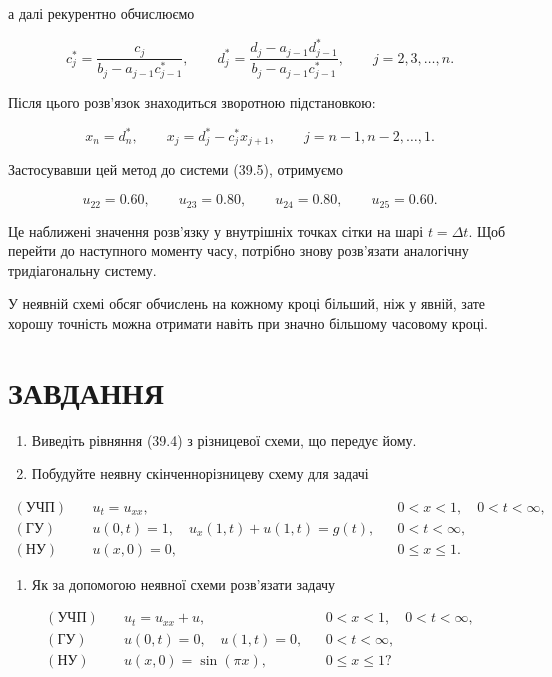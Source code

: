 \documentclass[
  ukrainian,
]{article}
\providecommand{\tightlist}{%
  \setlength{\itemsep}{0pt}\setlength{\parskip}{0pt}}
\begin{document}
а далі рекурентно обчислюємо

\[
c_j^*=\frac{c_j}{b_j-a_{j-1}c_{j-1}^*},\qquad d_j^*=\frac{d_j-a_{j-1}d_{j-1}^*}{b_j-a_{j-1}c_{j-1}^*},\qquad j=2,3,\dots,n.
\]

Після цього розв'язок знаходиться зворотною підстановкою:

\[
x_n=d_n^*,\qquad x_j=d_j^*-c_j^*x_{j+1},\qquad j=n-1,n-2,\dots,1.
\]

Застосувавши цей метод до системи (39.5), отримуємо

\[
u_{22}=0.60,\qquad u_{23}=0.80,\qquad u_{24}=0.80,\qquad u_{25}=0.60.
\]

Це наближені значення розв'язку у внутрішніх точках сітки на шарі
\(t=\Delta t\). Щоб перейти до наступного моменту часу, потрібно знову
розв'язати аналогічну тридіагональну систему.

У неявній схемі обсяг обчислень на кожному кроці більший, ніж у явній,
зате хорошу точність можна отримати навіть при значно більшому часовому
кроці.

\section{ЗАВДАННЯ}\label{ux437ux430ux432ux434ux430ux43dux43dux44f-20}

\begin{enumerate}
\def\labelenumi{\arabic{enumi}.}
\item
  Виведіть рівняння (39.4) з різницевої схеми, що передує йому.
\item
  Побудуйте неявну скінченнорізницеву схему для задачі
\end{enumerate}

\[
\begin{aligned}(\text{УЧП})\quad & u_t=u_{xx}, && 0<x<1,\quad 0<t<\infty,\\(\text{ГУ})\quad & u(0,t)=1,\quad u_x(1,t)+u(1,t)=g(t), && 0<t<\infty,\\(\text{НУ})\quad & u(x,0)=0, && 0\le x\le 1.\end{aligned}
\]

\begin{enumerate}
\def\labelenumi{\arabic{enumi}.}
\setcounter{enumi}{2}
\tightlist
\item
  Як за допомогою неявної схеми розв'язати задачу
\end{enumerate}

\[
\begin{aligned}(\text{УЧП})\quad & u_t=u_{xx}+u, && 0<x<1,\quad 0<t<\infty,\\(\text{ГУ})\quad & u(0,t)=0,\quad u(1,t)=0, && 0<t<\infty,\\(\text{НУ})\quad & u(x,0)=\sin(\pi x), && 0\le x\le 1?\end{aligned}
\]
\end{document}
